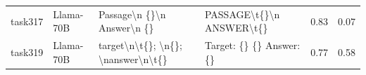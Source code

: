 \begin{longtable}{@{}p{0.8cm\tiny}p{1cm\tiny}p{4.1cm\ttfamily\tiny}p{4.1cm\ttfamily\tiny}p{0.8cm\tiny}p{0.8cm\tiny}@{}}
task317   & Llama-70B  & Passage\textbackslash{}n \{\}\textbackslash{}n Answer\textbackslash{}n \{\}                                                                                                                                                                                                                                                                                                                                                                                                                                             & PASSAGE\textbackslash{}t\{\}\textbackslash{}n ANSWER\textbackslash{}t\{\}                                                                                                                                                                                                                                                                                                                                                                                                                                                                                                         & 0.83 & 0.07 \\
task319   & Llama-70B  & target\textbackslash{}n\textbackslash{}t\{\}; \textbackslash{}n\{\}; \textbackslash{}nanswer\textbackslash{}n\textbackslash{}t\{\}                                                                                                                                                                                                                                                                                                                                                                                      & Target: \{\} \{\} Answer: \{\}                                                                                                                                                                                                                                                                                                                                                                                                                                                                                                                                                    & 0.77 & 0.58 \\

\end{longtable}

